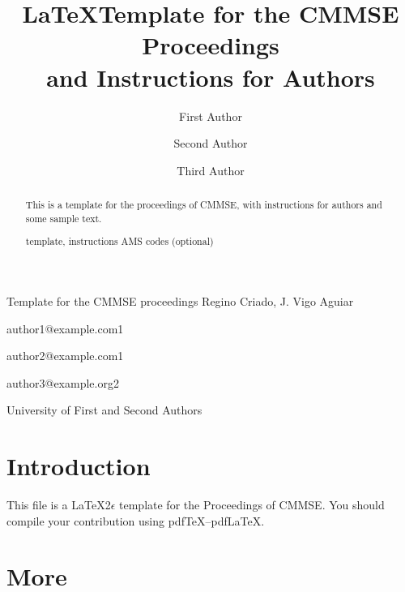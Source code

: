 \documentclass{cmmse2014}
\begin{document}


\newcommand{\Eqref}[1]{(\ref{#1})}



\markboth
  {Template for the CMMSE  proceedings} %
  {Regino Criado, J. Vigo Aguiar}



\title{\LaTeX\space Template for the CMMSE  Proceedings\\
  and Instructions for Authors}




\author{First Author}{author1@example.com}{1}

\author{Second Author}{author2@example.com}{1}

\author{Third Author}{author3@example.org}{2}


  {University of First and Second Authors}




\begin{abstract}
This is a template for the proceedings of CMMSE, with
instructions for authors and some sample text.

\keywords template, instructions \msccodes AMS codes (optional)
\end{abstract}


%
%


\section{Introduction}

This file is a \LaTeX2$\epsilon$ template for the Proceedings of
CMMSE. 
You should compile your contribution using pdf\TeX--pdf\LaTeX.

\section{More}
\end{document}
